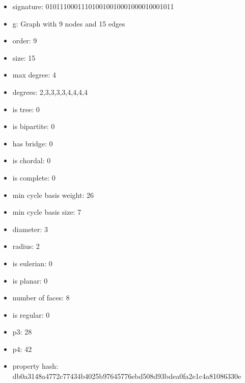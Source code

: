 \begin{figure}
\end{figure}
\begin{itemize}
\item signature: 010111000111010010010001000010001011
\item g: Graph with 9 nodes and 15 edges
\item order: 9
\item size: 15
\item max degree: 4
\item degrees: 2,3,3,3,3,4,4,4,4
\item is tree: 0
\item is bipartite: 0
\item has bridge: 0
\item is chordal: 0
\item is complete: 0
\item min cycle basis weight: 26
\item min cycle basis size: 7
\item diameter: 3
\item radius: 2
\item is eulerian: 0
\item is planar: 0
\item number of faces: 8
\item is regular: 0
\item p3: 28
\item p4: 42
\item property hash: db0a3148a4772c77434b4025b97645776ebd508d93bdea0fa2e1c4a81086330e
\end{itemize}
\newpage
